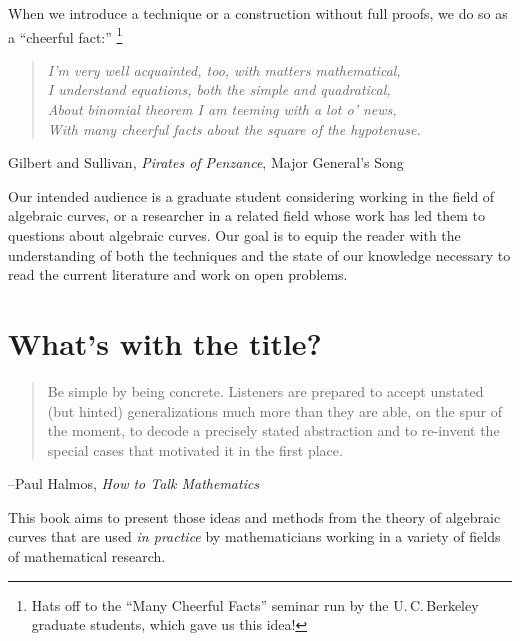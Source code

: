 When we introduce a technique or a construction without full proofs,
we do so as a ``cheerful fact:''%
\footnote{Hats off to the ``Many Cheerful Facts'' seminar run
by the
U.\,C.\,Berkeley
%
graduate students, which gave us this idea!}

\begin{quote}\it{I'm very well acquainted, too, with matters mathematical,\\
I understand equations, both the simple and quadratical,\\
About binomial theorem I am teeming with a lot o' news,\\
With many cheerful facts about the square of the hypotenuse.}
%
%
%
\end{quote}
\emdash Gilbert and Sullivan, {\it Pirates of Penzance}, Major General's Song

Our intended audience is a graduate student considering working in the field of algebraic curves, or a researcher in a related field whose work has led them to questions about algebraic curves. Our goal is to equip the reader with the understanding of both the techniques and the state of our knowledge necessary to read the current literature and work on open problems.

\section*{What's with the title?}

\begin{quote}
Be simple by being concrete. Listeners are prepared to
accept unstated (but hinted) generalizations much more than they are able, on the spur of the moment, to
decode a precisely stated abstraction and to re-invent the special cases that motivated it in the first place. 
\end{quote}

--Paul Halmos, {\it How to Talk Mathematics}
%

This book aims to present those ideas and methods from the theory of
algebraic curves that are used \emph{in practice} by mathematicians
working in a variety of fields of mathematical research.

